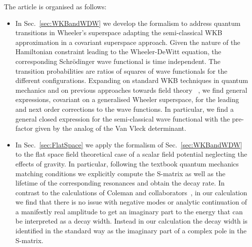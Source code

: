 \documentclass[a4paper,11pt]{article}
\numberwithin{equation}{section}
\begin{document}
The article is organised as follows:
\begin{itemize}
\item In Sec.~\ref{sec:WKBandWDW} we develop the formalism to address quantum transitions in Wheeler's superspace adapting the semi-classical WKB approximation in a  covariant superspace approach. Given the nature of the Hamiltonian constraint leading to  the Wheeler-DeWitt equation, the corresponding Schr\"odinger wave functional is time independent. The transition probabilities  are ratios of squares of wave functionals for the different configurations. Expanding on standard WKB techniques in quantum mechanics and on previous approaches towards field theory~
\cite{Banks:1973ps, Banks:1974ij, Gervais:1977nv, Bitar:1978vx,  Tanaka:1993ez}, we find general expressions, covariant on a generalised Wheeler superspace, for the leading and next order corrections to the wave functions. In particular, we find a general closed expression for the semi-classical wave functional with the pre-factor given by the analog of the Van Vleck determinant.

\item In Sec.~\ref{sec:FlatSpace} we apply the formalism of Sec.~\ref{sec:WKBandWDW} to the flat space field theoretical case of a scalar field potential neglecting the effects of gravity. In particular, following the textbook quantum mechanics matching conditions we explicitly compute the S-matrix as well as the lifetime of the corresponding resonances and obtain the decay rate.
In contrast to the calculations of Coleman and collaborators~\cite{Coleman:1977py, Callan:1977pt, Coleman:1980aw}, in our calculation we find that there is no issue with negative modes or analytic continuation of a manifestly real amplitude to get an imaginary part to the energy that can be interpreted as a decay width. Instead in our calculation the decay width is identified in the standard way as the imaginary part of a complex pole in the S-matrix.


\end{itemize}
\end{document}
